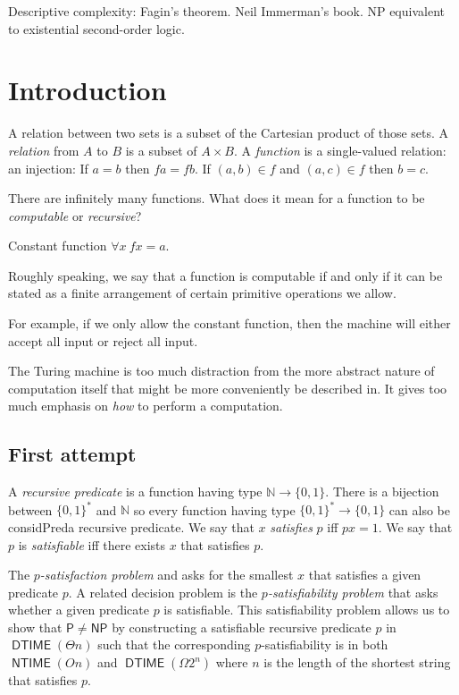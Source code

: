 \documentclass[10pt,statementpaper]{memoir}
\theoremstyle{definition}
\newcommand\DTIME{\operatorname{\mathsf{DTIME}}}
\newcommand\NTIME{\operatorname{\mathsf{NTIME}}}
\newcommand\PTIME{\ensuremath{\mathsf{P}}}
\newcommand\NPTIME{\ensuremath{\mathsf{NP}}}
\begin{document}
Descriptive complexity: Fagin's theorem.
Neil Immerman's book.
NP equivalent to existential second-order logic.

\chapter{Introduction}

A relation between two sets is a subset of the Cartesian product of those sets.
A \emph{relation} from $A$ to $B$ is a subset of $A \times B$.
A \emph{function} is a single-valued relation:
an injection:
If $a = b$ then $f a = f b$.
If $(a,b) \in f$ and $(a,c) \in f$ then $b = c$.

There are infinitely many functions.
What does it mean for a function to be \emph{computable} or \emph{recursive}?

Constant function $\forall x ~ f x = a$.

Roughly speaking, we say that a function is computable
if and only if it can be stated as a finite arrangement
of certain primitive operations we allow.

For example, if we only allow the constant function,
then the machine will either accept all input or reject all input.

The Turing machine is too much distraction
from the more abstract nature of computation itself
that might be more conveniently be described in.
It gives too much emphasis on \emph{how} to perform a computation.

\section{First attempt}

A \emph{recursive predicate} is a function having type $\mathbb N \to \{0,1\}$.
There is a bijection between $\{0,1\}^*$ and $\mathbb N$
so every function having type $\{0,1\}^* \to \{0,1\}$ can also be considPred{a} recursive predicate.
We say that $x$ \emph{satisfies} $p$ iff $px = 1$.
We say that $p$ is \emph{satisfiable} iff there exists $x$ that satisfies $p$.

The \emph{$p$-satisfaction problem}
and asks for the smallest $x$ that satisfies a given predicate $p$.
A related decision problem is the \emph{$p$-satisfiability problem} that
asks whether a given predicate $p$ is satisfiable.
This satisfiability problem allows us to show that $\PTIME \neq \NPTIME$
by constructing a satisfiable recursive predicate
$p$ in $\DTIME(\Theta n)$ such that
the corresponding $p$-satisfiability is in both $\NTIME(On)$ and $\DTIME(\Omega 2^n)$
where $n$ is the length of the shortest string that satisfies $p$.
\end{document}
